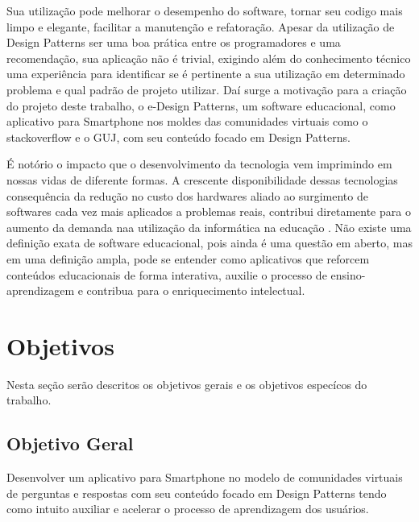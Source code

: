 Sua utilização pode melhorar o desempenho do software, tornar seu codigo mais limpo e elegante, facilitar a manutenção e refatoração. Apesar da utilização 
de Design Patterns ser uma boa prática entre os programadores e uma recomendação, sua aplicação não é trivial, exigindo além do conhecimento técnico  
uma experiência para identificar se é pertinente a sua utilização em determinado problema e  qual padrão de projeto utilizar. Daí surge a motivação para a 
criação do projeto deste trabalho, o e-Design Patterns,  um software educacional, como aplicativo para Smartphone nos moldes das comunidades virtuais 
como o stackoverflow e o GUJ, com seu conteúdo focado em Design Patterns.

É notório o impacto que o desenvolvimento da tecnologia vem imprimindo em nossas vidas de diferente formas. A crescente disponibilidade dessas 
tecnologias consequência da redução no custo dos hardwares aliado ao surgimento de softwares cada vez mais aplicados a problemas reais, contribui
 diretamente para o aumento da demanda naa utilização da informática na educação \cite{brandao1998repensando}. 
Não existe uma definição exata de software educacional, pois ainda é uma questão em aberto, mas em uma definição ampla, pode se entender como 
aplicativos que reforcem conteúdos educacionais de forma interativa, auxilie o processo de ensino-aprendizagem e contribua para o enriquecimento
 intelectual\cite{oliveira2001proposta}.


\section{Objetivos}%
Nesta seção serão descritos os objetivos gerais e os objetivos especícos do trabalho.

\subsection{Objetivo Geral}%

Desenvolver um aplicativo para Smartphone no modelo de comunidades virtuais de perguntas e respostas com seu conteúdo focado em Design Patterns tendo como intuito auxiliar e acelerar o processo de aprendizagem dos usuários.

